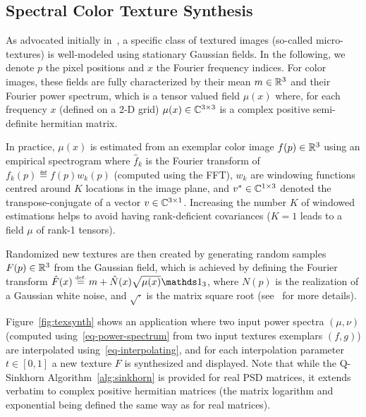 

\subsection{Spectral Color Texture Synthesis}

As advocated initially in~\cite{galerne2011random}, a specific class of textured images (so-called micro-textures) is well-modeled using stationary Gaussian fields. In the following, we denote $p$ the pixel positions and $x$ the Fourier frequency indices. For color images, these fields are fully characterized by their mean $m \in \mathbb{R}^3$ and their Fourier power spectrum, which is a tensor valued field $\mu(x)$ where, for each frequency $x$ (defined on a 2-D grid) $\mu(x) \in \mathbb{C}^{3 \times 3}$ is a complex positive semi-definite hermitian matrix. 

In practice, $\mu(x)$ is estimated from an exemplar color image $f(p) \in \mathbb{R}^3$ using an empirical spectrogram 
where $\hat f_k$ is the Fourier transform of $f_k(p) \eqdef f(p) w_k(p)$ (computed using the FFT), $w_k$ are windowing functions centred around $K$ locations in the image plane, and $v^* \in \mathbb{C}^{1 \times 3}$ denoted the transpose-conjugate of a vector $v \in \mathbb{C}^{3 \times 1}$. 
%
Increasing the number $K$ of windowed estimations helps to avoid having rank-deficient covariances ($K=1$ leads to a field $\mu$ of rank-1 tensors).

Randomized new textures are then created by generating random samples $F(p) \in \mathbb{R}^3$ from the Gaussian field, which is achieved by defining the Fourier transform $\hat F(x) \eqdef m + \hat N(x) \sqrt{\mu(x)} \ones_3$, where $N(p)$ is the realization of a Gaussian white noise, and $\sqrt{\cdot}$ is the matrix square root (see~\cite{galerne2011random} for more details).

Figure~\ref{fig:texsynth} shows an application where two input power spectra $(\mu,\nu)$ (computed using~\eqref{eq-power-spectrum} from two input textures exemplars $(f,g)$)  are interpolated using~\eqref{eq-interpolating}, and for each interpolation parameter $t \in [0,1]$ a new texture $F$ is synthesized and displayed.
%
Note that while the Q-Sinkhorn Algorithm~\ref{alg:sinkhorn} is provided for real PSD matrices, it extends verbatim to complex positive hermitian matrices (the matrix logarithm and exponential being defined the same way as for real matrices).



